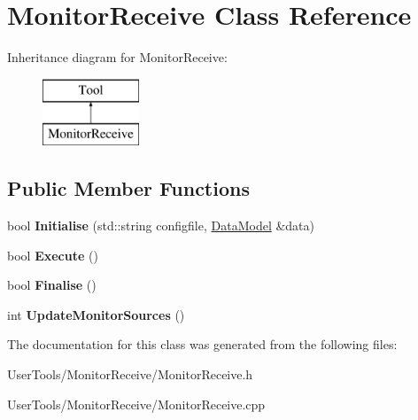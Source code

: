 \hypertarget{classMonitorReceive}{\section{Monitor\-Receive Class Reference}
\label{classMonitorReceive}
}
Inheritance diagram for Monitor\-Receive\-:\begin{figure}[H]
\begin{center}
\leavevmode
\includegraphics[height=2.000000cm]{classMonitorReceive}
\end{center}
\end{figure}
\subsection*{Public Member Functions}
\begin{DoxyCompactItemize}
\item 
\hypertarget{classMonitorReceive_a635e0cf91b53352483bb0f30a27c1287}{bool {\bfseries Initialise} (std\-::string configfile, \hyperlink{classDataModel}{Data\-Model} \&data)}\label{classMonitorReceive_a635e0cf91b53352483bb0f30a27c1287}

\item 
\hypertarget{classMonitorReceive_a316f1f7d2a21f698faa0cb8d0583c49a}{bool {\bfseries Execute} ()}\label{classMonitorReceive_a316f1f7d2a21f698faa0cb8d0583c49a}

\item 
\hypertarget{classMonitorReceive_a9f11f11200f7cca1cffc38d9021f831a}{bool {\bfseries Finalise} ()}\label{classMonitorReceive_a9f11f11200f7cca1cffc38d9021f831a}

\item 
\hypertarget{classMonitorReceive_a87daa52032531a34d499d4ca510a5627}{int {\bfseries Update\-Monitor\-Sources} ()}\label{classMonitorReceive_a87daa52032531a34d499d4ca510a5627}

\end{DoxyCompactItemize}


The documentation for this class was generated from the following files\-:\begin{DoxyCompactItemize}
\item 
User\-Tools/\-Monitor\-Receive/Monitor\-Receive.\-h\item 
User\-Tools/\-Monitor\-Receive/Monitor\-Receive.\-cpp\end{DoxyCompactItemize}
